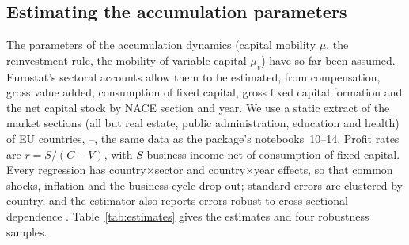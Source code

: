 \documentclass[11pt]{article}
\begin{document}
\begin{table}[htbp]
\centering
\caption{Real final demand in the dynamics, Portugal 2022, real $A$, by
number of sectors $N$. Rationed share: mean fraction of sectors with
$\kappa_j<1$ along a 30-period trajectory. Growth of $\sum C$: ratio of
final to initial total constant capital on that trajectory. $g^\star$:
balanced-growth rate of the cross-dual model ($\mu=0.5$, $\beta=0.5$)
with the net-output basket and with the real household basket; ``stable'':
whether both rays are locally stable. Generated by
\texttt{paper/generate\_results.jl}.}
\label{tab:final-demand}
{\small\setlength{\tabcolsep}{4pt}}
\end{table}

\begin{table}[htbp]
\centering
\caption{The supply side of quantity rationing, variant by variant,
Portugal 2022, real $A$, 30 periods. Rationed: mean share of sectors with
$\kappa_j<1$. $\bar\kappa_{0\text{--}10}$: mean $\kappa$ over the first
ten periods. $\sum C$: ratio of final to initial total constant capital.
Netted: supply $\max(x-Ax-\varphi x,0)$; capital goods: investment buys
goods in the composition of the table's row residual, with gross output
rescaled to the table's composition at $t=0$. Unless stated, the
calibrated $\sigma_v=\RVSigmaVCal$. Generated by
\texttt{paper/generate\_results.jl}.}
\label{tab:rationing-variants}
{\small\setlength{\tabcolsep}{4pt}}
\end{table}

\subsection{Estimating the accumulation parameters}
\label{sec:estimation}

The parameters of the accumulation dynamics (capital mobility $\mu$, the
reinvestment rule, the mobility of variable capital $\mu_v$) have so far
been assumed. Eurostat's sectoral accounts allow them to be estimated,
from compensation, gross value added, consumption of fixed capital,
gross fixed capital formation and the net capital stock by NACE section
and year. We use a static extract of the \EstSectors{} market sections
(all but real estate, public administration, education and health) of
\EstCountries{} EU countries, \EstYearFrom--\EstYearTo, the same data as
the package's notebooks~10--14. Profit rates are $r=S/(C+V)$, with $S$
business income net of consumption of fixed capital. Every regression
has country$\times$sector and country$\times$year effects, so that common
shocks, inflation and the business cycle drop out; standard errors are
clustered by country, and the estimator also reports errors robust to
cross-sectional dependence \citep{driscoll1998consistent}.
Table~\ref{tab:estimates} gives the estimates and four robustness
samples.
\end{document}
